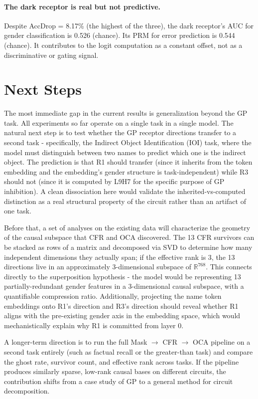 \documentclass[11pt,a4paper]{article}
\begin{document}
\paragraph{The dark receptor is real but not predictive.} Despite AccDrop = 8.17\% (the highest of the three), the dark receptor's AUC for gender classification is 0.526 (chance). Its PRM for error prediction is 0.544 (chance). It contributes to the logit computation as a constant offset, not as a discriminative or gating signal.


\section{Next Steps}
\label{sec:next}

The most immediate gap in the current results is generalization beyond the GP task. All experiments so far operate on a single task in a single model. The natural next step is to test whether the GP receptor directions transfer to a second task - specifically, the Indirect Object Identification (IOI) task, where the model must distinguish between two names to predict which one is the indirect object. The prediction is that R1 should transfer (since it inherits from the token embedding and the embedding's gender structure is task-independent) while R3 should not (since it is computed by L9H7 for the specific purpose of GP inhibition). A clean dissociation here would validate the inherited-vs-computed distinction as a real structural property of the circuit rather than an artifact of one task.

Before that, a set of analyses on the existing data will characterize the geometry of the causal subspace that CFR and OCA discovered. The 13 CFR survivors can be stacked as rows of a matrix and decomposed via SVD to determine how many independent dimensions they actually span; if the effective rank is 3, the 13 directions live in an approximately 3-dimensional subspace of $\mathbb{R}^{768}$. This connects directly to the superposition hypothesis - the model would be representing 13 partially-redundant gender features in a 3-dimensional causal subspace, with a quantifiable compression ratio. Additionally, projecting the name token embeddings onto R1's direction and R3's direction should reveal whether R1 aligns with the pre-existing gender axis in the embedding space, which would mechanistically explain why R1 is committed from layer 0.

A longer-term direction is to run the full Mask $\to$ CFR $\to$ OCA pipeline on a second task entirely (such as factual recall or the greater-than task) and compare the ghost rate, survivor count, and effective rank across tasks. If the pipeline produces similarly sparse, low-rank causal bases on different circuits, the contribution shifts from a case study of GP to a general method for circuit decomposition.
\end{document}
